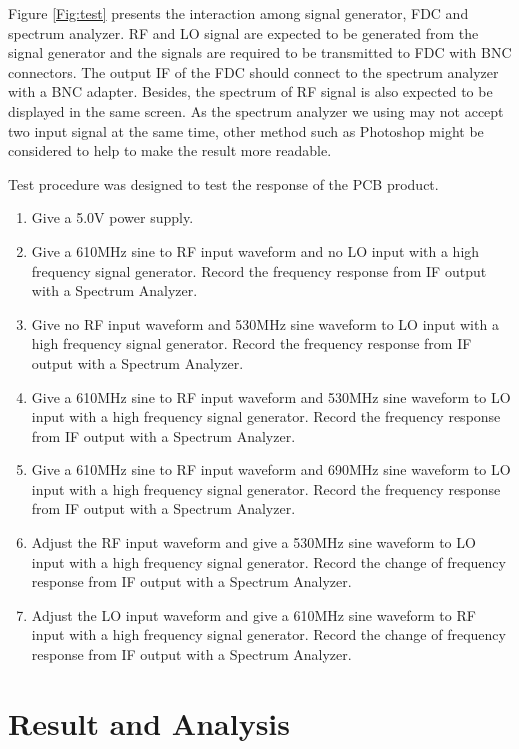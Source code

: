 \documentclass[12pt, a4paper]{report}
\begin{document}
Figure \ref{Fig:test} presents the interaction among signal generator, FDC and spectrum analyzer. RF and LO signal are expected to be generated from the signal generator and the signals are required to be transmitted to FDC with BNC connectors. The output IF of the FDC should connect to the spectrum analyzer with a BNC adapter. Besides, the spectrum of RF signal is also expected to be displayed in the same screen. As the spectrum analyzer we using may not accept two input signal at the same time, other method such as Photoshop might be considered to help to make the result more readable.

Test procedure was designed to test the response of the PCB product. 

\begin{enumerate}
 \item Give a 5.0V power supply.
 \item Give a 610MHz sine to RF input waveform and no LO input with a high frequency signal generator. Record the frequency response from IF output with a Spectrum Analyzer.
 \item Give no RF input waveform and 530MHz sine waveform to LO input with a high frequency signal generator. Record the frequency response from IF output with a Spectrum Analyzer.
 \item Give a 610MHz sine to RF input waveform and 530MHz sine waveform to LO input with a high frequency signal generator. Record the frequency response from IF output with a Spectrum Analyzer.
 \item Give a 610MHz sine to RF input waveform and 690MHz sine waveform to LO input with a high frequency signal generator. Record the frequency response from IF output with a Spectrum Analyzer.
 \item Adjust the RF input waveform and give a 530MHz sine waveform to LO input with a high frequency signal generator. Record the change of frequency response from IF output with a Spectrum Analyzer.
 \item Adjust the LO input waveform and give a 610MHz sine waveform to RF input with a high frequency signal generator. Record the change of frequency response from IF output with a Spectrum Analyzer.


\end{enumerate}





\chapter{Result and Analysis}
\end{document}
